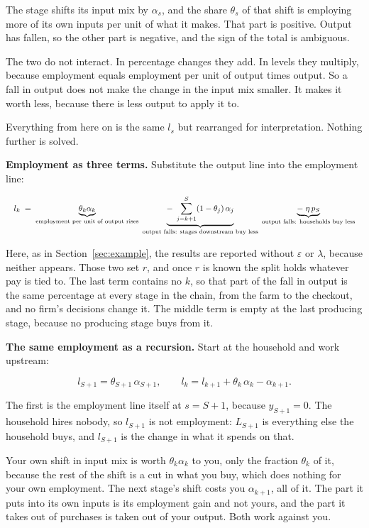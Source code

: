 \documentclass[11pt,a4paper]{article}
\begin{document}
The stage shifts its input mix by $\alpha_s$, and the share $\theta_s$ of that shift is employing more of its own inputs per unit of what it makes. That part is positive. Output has fallen, so the other part is negative, and the sign of the total is ambiguous.

The two do not interact. In percentage changes they add. In levels they multiply, because employment equals employment per unit of output times output. So a fall in output does not make the change in the input mix smaller. It makes it worth less, because there is less output to apply it to.

Everything from here on is the same $l_s$ but rearranged for interpretation. Nothing further is solved.

\textbf{Employment as three terms.} Substitute the output line into the employment line:

\begin{equation}
\resizebox{\textwidth}{!}{$\displaystyle
l_k \;=\;
\underbrace{\theta_k \alpha_k}_{\text{employment per unit of output rises}}
\;\underbrace{-\;\sum_{j=k+1}^{S} (1-\theta_j)\,\alpha_j}_{\text{output falls: stages downstream buy less}}
\;\underbrace{-\;\eta \, p_S}_{\text{output falls: households buy less}}
$}
\end{equation}

Here, as in Section~\ref{sec:example}, the results are reported without $\varepsilon$ or $\lambda$, because neither appears. Those two set $r$, and once $r$ is known the split holds whatever pay is tied to. The last term contains no $k$, so that part of the fall in output is the same percentage at every stage in the chain, from the farm to the checkout, and no firm's decisions change it. The middle term is empty at the last producing stage, because no producing stage buys from it.

\textbf{The same employment as a recursion.} Start at the household and work upstream:

\begin{equation}
l_{S+1} = \theta_{S+1}\,\alpha_{S+1} ,
\qquad
l_k = l_{k+1} + \theta_k\,\alpha_k - \alpha_{k+1} .
\end{equation}

The first is the employment line itself at $s = S+1$, because $y_{S+1} = 0$. The household hires nobody, so $l_{S+1}$ is not employment: $L_{S+1}$ is everything else the household buys, and $l_{S+1}$ is the change in what it spends on that.

Your own shift in input mix is worth $\theta_k \alpha_k$ to you, only the fraction $\theta_k$ of it, because the rest of the shift is a cut in what you buy, which does nothing for your own employment. The next stage's shift costs you $\alpha_{k+1}$, all of it. The part it puts into its own inputs is its employment gain and not yours, and the part it takes out of purchases is taken out of your output. Both work against you.
\end{document}
